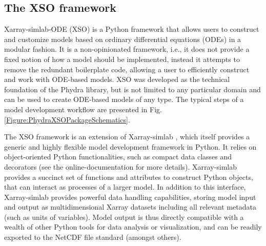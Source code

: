 \documentclass[gmd, manuscript]{copernicus}
\begin{document}

\subsection{The XSO framework} \label{Section:XSOFramework}

Xarray-simlab-ODE (XSO) is a Python framework that allows users to construct and customize models based on ordinary differential equations (ODEs) in a modular fashion. It is a non-opinionated framework, i.e., it does not provide a fixed notion of how a model should be implemented, instead it attempts to remove the redundant boilerplate code, allowing a user to efficiently construct and work with ODE-based models. XSO was developed as the technical foundation of the Phydra library, but is not limited to any particular domain and can be used to create ODE-based models of any type. The typical steps of a model development workflow are presented in Fig. \ref{Figure:PhydraXSOPackageSchematics}.

The XSO framework is an extension of Xarray-simlab \citep{Bovy2018Xarray-simlab:Interactively, Bovy2021Benbovy/xarray-simlab:0.5.0}, which itself provides a generic and highly flexible model development framework in Python. It relies on object-oriented Python functionalities, such as compact data classes and decorators (see the online-documentation for more details). Xarray-simlab provides a succinct set of functions and attributes to construct Python objects, that can interact as processes of a larger model. In addition to this interface, Xarray-simlab provides powerful data handling capabilities, storing model input and output as multidimensional Xarray datasets \citep{Hoyer2017Xarray:Python} including all relevant metadata (such as units of variables). Model output is thus directly compatible with a wealth of other Python tools for data analysis or visualization, and can be readily exported to the NetCDF file standard (amongst others). 
\end{document}
